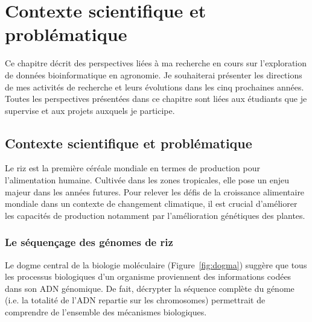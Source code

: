 \chapter{Contexte scientifique et problématique} %

\label{Perspectives} %

Ce chapitre décrit des perspectives liées à ma recherche en cours sur l'exploration de données bioinformatique en agronomie.
Je souhaiterai présenter les directions de mes activités de recherche et leurs évolutions dans les cinq prochaines années. Toutes les perspectives présentées dans ce chapitre sont liées aux étudiants que je supervise et aux projets auxquels je participe.



\section{Contexte scientifique et problématique}

Le riz est la première céréale mondiale en termes de production pour l'alimentation humaine. Cultivée dans les zones tropicales, elle pose un enjeu majeur dans les années futures. Pour relever les défis de la croissance alimentaire mondiale dans un contexte de changement climatique, il est crucial d'améliorer les capacités de production notamment par l’amélioration génétiques des plantes. \\

\subsection{Le séquençage des génomes de riz}
Le dogme central de la biologie moléculaire (Figure~\ref{fig:dogma}) suggère que tous les processus biologiques d'un organisme proviennent des informations codées dans son ADN génomique. De fait, décrypter la séquence complète du génome (i.e. la totalité de l'ADN repartie sur les chromosomes) permettrait de comprendre de l'ensemble des mécanismes biologiques.\\

